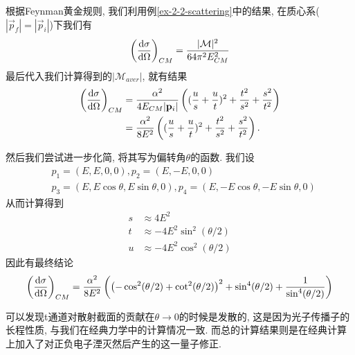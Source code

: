 \begin{example}[Bhabha散射]
    根据Feynman黄金规则, 我们利用例\ref{ex-2-2-scattering}中的结果, 在质心系($|\vec p_f|=|\vec p_i|$)下我们有
    \begin{equation}
        \left(\frac{\mathrm d\sigma}{\mathrm d\Omega}\right)_{CM}=\frac{|\mathcal M|^2}{64\pi^2E_{CM}^2}
    \end{equation}
    最后代入我们计算得到的$|\mathcal M_{aver}|$, 就有结果
    \begin{align}
        \left(\frac{\mathrm d\sigma}{\mathrm d\Omega}\right)_{CM}&=\frac{\alpha^2}{4E_{CM}|\mathbf{p}_i|}\left((\frac us+\frac ut)^2+\frac{t^2}{s^2}+\frac{s^2}{t^2}\right)\\
        &=\frac{\alpha^2}{8E^2}\left((\frac us+\frac ut)^2+\frac{t^2}{s^2}+\frac{s^2}{t^2}\right).
    \end{align}

    然后我们尝试进一步化简, 将其写为偏转角$\theta$的函数. 我们设
    \begin{align}
        &p_1=(E, E, 0, 0), p_2=(E, -E, 0, 0)\\
        &p_3=(E, E\cos\theta, E\sin\theta, 0), p_4=(E, -E\cos\theta, -E\sin\theta, 0)
    \end{align}
    从而计算得到
    \begin{align}
        s&\approx4E^2\\
        t&\approx-4E^2\sin^2(\theta/2)\\
        u&\approx-4E^2\cos^2(\theta/2)
    \end{align}
    因此有最终结论
    \begin{equation}
        \left(\frac{\mathrm d\sigma}{\mathrm d\Omega}\right)_{CM}=\frac{\alpha^2}{8E^2}\left(\left(-\cos^2(\theta/2)+\cot^2(\theta/2)\right)^2+\sin^4(\theta/2)+\frac1{\sin^4(\theta/2)}\right)
    \end{equation}
    
    可以发现t通道对散射截面的贡献在$\theta\to0$的时候是发散的, 这是因为光子传播子的长程性质, 与我们在经典力学中的计算情况一致. 而总的计算结果则是在经典计算上加入了对正负电子湮灭然后产生的这一量子修正.
\end{example}
